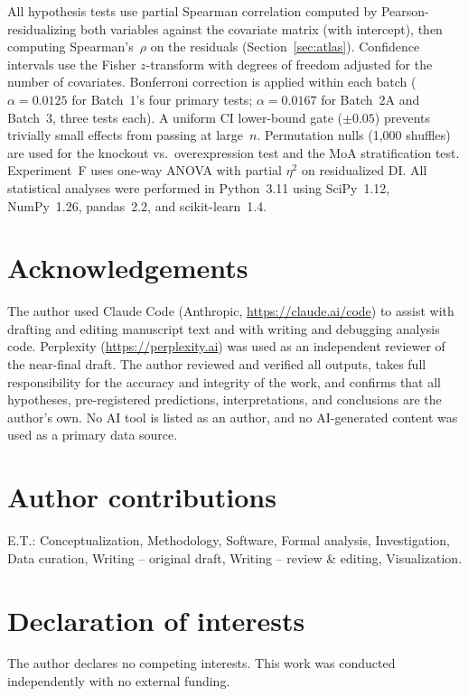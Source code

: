 \documentclass[11pt]{article}
\begin{document}
All hypothesis tests use partial Spearman correlation computed by
Pearson-residualizing both variables against the covariate matrix (with
intercept), then computing Spearman's~$\rho$ on the residuals
(Section~\ref{sec:atlas}).  Confidence intervals use the Fisher
$z$-transform with degrees of freedom adjusted for the number of
covariates.  Bonferroni correction is applied within each batch
($\alpha = 0.0125$ for Batch~1's four primary tests; $\alpha = 0.0167$
for Batch~2A and Batch~3, three tests each).  A uniform CI lower-bound
gate ($\pm 0.05$) prevents trivially small effects from passing at
large~$n$.  Permutation nulls (1{,}000 shuffles) are used for the
knockout vs.\ overexpression test and the MoA stratification test.
Experiment~F uses one-way ANOVA with partial $\eta^2$ on
residualized DI.  All statistical analyses were performed in Python~3.11
using SciPy~1.12, NumPy~1.26, pandas~2.2, and scikit-learn~1.4.

\section*{Acknowledgements}

The author used Claude Code (Anthropic, \url{https://claude.ai/code}) to
assist with drafting and editing manuscript text and with writing and
debugging analysis code. Perplexity (\url{https://perplexity.ai}) was
used as an independent reviewer of the near-final draft. The author
reviewed and verified all outputs, takes full responsibility for the
accuracy and integrity of the work, and confirms that all hypotheses,
pre-registered predictions, interpretations, and conclusions are the
author's own. No AI tool is listed as an author, and no AI-generated
content was used as a primary data source.

\section*{Author contributions}

E.T.: Conceptualization, Methodology, Software, Formal analysis,
Investigation, Data curation, Writing -- original draft, Writing --
review \& editing, Visualization.

\section*{Declaration of interests}

The author declares no competing interests.  This work was conducted
independently with no external funding.
\end{document}
